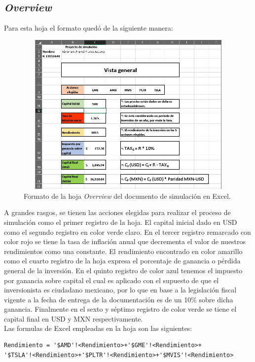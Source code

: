 \documentclass[letterpaper, 12pt]{article}
\begin{document}
\begin{justify}
        \subsection{\emph{Overview}}
        \justify
        Para esta hoja el formato quedó de la siguiente manera:
        \begin{figure}[H]
            \centering
            \includegraphics[height=8cm,width=14cm]{formato_overview.PNG}
            \caption{Formato de la hoja \emph{Overview} del documento de simulación en Excel.}
        \end{figure}
        \justify
        A grandes rasgos, se tienen las acciones elegidas para realizar el proceso de simulación como el primer registro de la hoja. 
        El capital inicial dado en USD como el segundo registro en color verde claro. En el tercer registro remarcado con color rojo se tiene la tasa de inflación anual
        que decrementa el valor de nuestros rendimientos como una constante. El rendimiento encontrado en color amarillo como el cuarto registro de la hoja expresa el porcentaje de ganancia o pérdida general de la inversión. En el quinto registro de color azul tenemos el impuesto por ganancia
        sobre capital el cual es aplicado con el supuesto de que el inversionista es ciudadano mexicano, por lo que en base a la legislación fiscal vigente a la fecha de entrega de la documentación es de un 10\% sobre dicha ganancia. Finalmente en el sexto y séptimo registro de color verde se 
        tiene el capital final en USD y MXN respectivamente.
        \\\newline
        Las formulas de Excel empleadas en la hoja son las siguientes: 
            \begin{verbatim}
Rendimiento = '$AMD'!<Rendimiento>+'$GME'!<Rendimiento>+
'$TSLA'!<Rendimiento>+'$PLTR'!<Rendimiento>+'$MVIS'!<Rendimiento>


\end{verbatim}
\end{justify}
\end{document}
